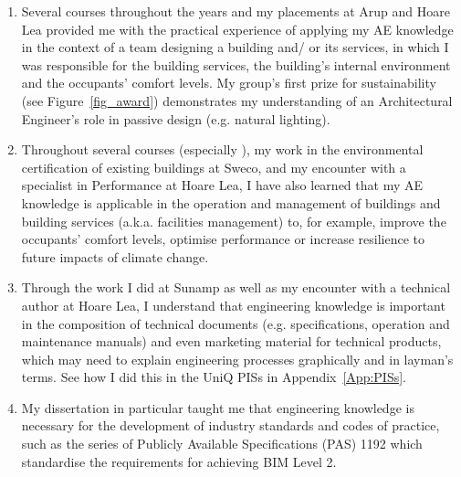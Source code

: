 \begin{enumerate}
	\item %
	Several courses throughout the years and my placements at Arup and Hoare Lea
	provided me with the practical experience of applying my AE knowledge in the context of a team designing a building and/ or its services, in which I was responsible for the building services, the building's internal environment and the occupants' comfort levels.
	My group's first prize for sustainability (see Figure~\ref{fig_award}) demonstrates my understanding of an Architectural Engineer's role in passive design (e.g. natural lighting).
	
	\item Throughout several courses (especially \FMPTitle),
	my work in the environmental certification of existing buildings at Sweco,
	and
	my encounter with a specialist in Performance at Hoare Lea,
	I have also learned that my AE knowledge is applicable in the operation and management of buildings and building services (a.k.a. facilities management) to, for example, improve the occupants' comfort levels, optimise performance or increase resilience to future impacts of climate change.
	
	\item Through the work I did at Sunamp as well as my encounter with a technical author at Hoare Lea, I understand that engineering knowledge is important in the composition of technical documents (e.g. specifications, operation and maintenance manuals) and even marketing material for technical products, which may need to explain engineering processes graphically and in layman's terms.
	See how I did this in the UniQ PISs in Appendix~\ref{App:PISs}.
	
	\item My dissertation in particular taught me that engineering knowledge is necessary for the development of industry standards and codes of practice, such as the series of Publicly Available Specifications (PAS) 1192 which standardise the requirements for achieving BIM Level 2.
	

\end{enumerate}

